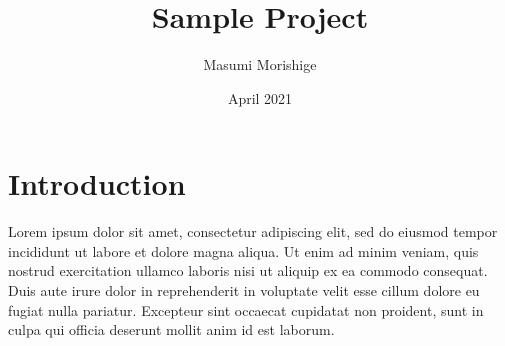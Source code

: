 \documentclass{article}
\title{Sample Project}
\author{Masumi Morishige}
\date{April 2021}
\begin{document}
    \maketitle
    \section{Introduction}
    Lorem ipsum dolor sit amet, consectetur adipiscing elit, sed do eiusmod tempor incididunt ut labore et dolore magna aliqua. Ut enim ad minim veniam, quis nostrud exercitation ullamco laboris nisi ut aliquip ex ea commodo consequat. Duis aute irure dolor in reprehenderit in voluptate velit esse cillum dolore eu fugiat nulla pariatur. Excepteur sint occaecat cupidatat non proident, sunt in culpa qui officia deserunt mollit anim id est laborum.
\end{document}
